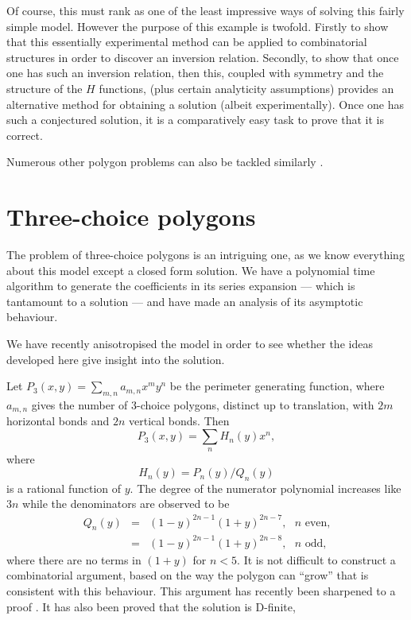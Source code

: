 Of course, this must rank as one of the least impressive
ways of solving this fairly simple model. However the
purpose of this example is twofold. Firstly to show that
this essentially experimental method can be applied
to combinatorial structures in order to discover an
inversion relation. Secondly, to show that once one has such an
inversion relation, then this, coupled with symmetry and the
structure of the $H$ functions, (plus certain analyticity assumptions)
provides an alternative method for obtaining a solution
(albeit experimentally). Once one has such a conjectured
solution, it is a comparatively easy task to prove that it is
correct.

Numerous other polygon problems can also be tackled 
similarly \cite{ROG}.


\section{Three-choice polygons}

The problem of three-choice polygons \cite{ARC97} is an intriguing
one, as we know everything about this model except a closed
form solution. We have a polynomial time algorithm to
generate the coefficients in its series expansion --- which
is tantamount to a solution --- and have made an analysis
of its asymptotic behaviour.

We have recently anisotropised the model \cite{ARC,WPC} in order 
to see whether
the ideas developed here give insight into the solution.

Let $P_3(x,y) = \sum_{m,n} a_{m,n} x^m y^n $ be the perimeter
generating function, where $a_{m,n}$ gives the number of
3-choice polygons, distinct up to translation, with $2m$
horizontal bonds and $2n$ vertical bonds. Then
$$P_3(x,y) = \sum_n H_n(y) x^n, $$ where 
$$H_n(y) = P_n(y)/Q_n(y)$$ is a rational function of $y.$ The
degree of the numerator polynomial increases like $3n$ while
the denominators are observed to be
\begin{eqnarray*}
Q_n(y) &=& (1 - y)^{2n-1}(1 + y)^{2n-7}, \mbox{ $n$ even,} \\ 
      & =&  (1 - y)^{2n-1}(1 + y)^{2n-8}, \mbox{ $n$ odd,}
\end{eqnarray*}
where there are no terms in $(1+y)$ for $n < 5.$ It is
not difficult to construct a combinatorial argument,
based on the way the polygon can ``grow'' that is consistent
with this behaviour. This argument 
has recently been sharpened to a proof \cite{BMP98}.
It has also been proved \cite{BMP98} that the solution is
D-finite,

